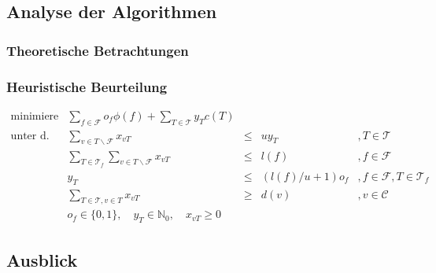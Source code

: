 \documentclass[a4paper,ngerman,12pt,bibtotoc]{scrartcl}
\theoremstyle{definition}
\theoremstyle{plain}
\theoremstyle{remark}
\newcommand{\IN}{\mathbb{N}}
\newcommand{\ClientSet}{\mathscr{C}}
\newcommand{\FacilitySet}{\mathscr{F}}
\newcommand{\allTours}{\mathscr{T}}
\begin{document}
	

	\subsection{Analyse der Algorithmen}\label{sec:Analyse}
	
	\subsubsection{Theoretische Betrachtungen}

		
		
	\subsubsection{Heuristische Beurteilung}
	
	\begin{align*}
		\text{minimiere} 	&\sum_{f \in \FacilitySet} o_f \phi(f) + \sum_{T \in \allTours} y_T c(T)&	  &		& 										\\
		\text{unter d. N.:} &\sum_{v \in T\backslash\FacilitySet} x_{vT} 							&\leq &u y_T &, T \in \allTours 					\\
							&\sum_{T \in \allTours_f} \sum_{v \in T\backslash\FacilitySet} x_{vT} 	&\leq &l(f) 	&, f \in \FacilitySet				\\
							&y_T 											&\leq &\left(l(f)/u + 1\right)o_f	&, f \in \FacilitySet, T \in \allTours_f \\
							&\sum_{T \in \allTours, v \in T} x_{vT} 								&\geq &d(v)	&, v \in \ClientSet						\\
							&o_f \in \{0,1\},\quad y_T \in \IN_0, \quad x_{vT} \geq 0				& 	  &		&
	\end{align*}


	\subsection{Ausblick}
	
	
	

\newpage	
\listoftodos

\newpage
\nocite{*}
\printbibliography		
			
\end{document}
